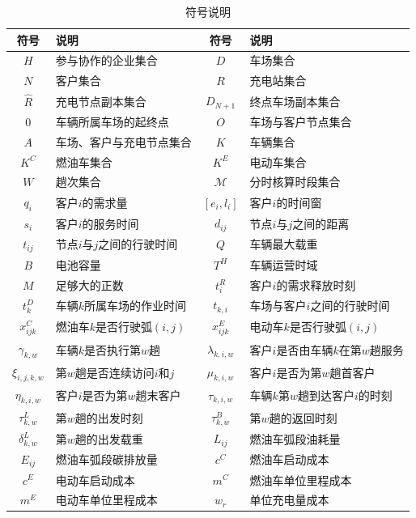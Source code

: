 \begin{table}[H]
\centering
\caption{符号说明}
\label{tab:symbols}
\fontsize{8.3pt}{9.3pt}\selectfont
\renewcommand{\arraystretch}{0.88}
\setlength{\tabcolsep}{1.5pt}
\begin{tabular*}{\linewidth}{@{\extracolsep{\fill}}cJ|cJ@{}}
\toprule
符号 & 说明 & 符号 & 说明\\
\midrule
$H$ & 参与协作的企业集合 & $D$ & 车场集合\\
$N$ & 客户集合 & $R$ & 充电站集合\\
$\widehat R$ & 充电节点副本集合 & $D_{N+1}$ & 终点车场副本集合\\
$0$ & 车辆所属车场的起终点 & $O$ & 车场与客户节点集合\\
$A$ & 车场、客户与充电节点集合 & $K$ & 车辆集合\\
$K^C$ & 燃油车集合 & $K^E$ & 电动车集合\\
$W$ & 趟次集合 & $\mathcal M$ & 分时核算时段集合\\
$q_i$ & 客户$i$的需求量 & $[e_i,l_i]$ & 客户$i$的时间窗\\
$s_i$ & 客户$i$的服务时间 & $d_{ij}$ & 节点$i$与$j$之间的距离\\
$t_{ij}$ & 节点$i$与$j$之间的行驶时间 & $Q$ & 车辆最大载重\\
$B$ & 电池容量 & $T^H$ & 车辆运营时域\\
$M$ & 足够大的正数 & $t_i^R$ & 客户$i$的需求释放时刻\\
$t_k^D$ & 车辆$k$所属车场的作业时间 & $t_{k,i}$ & 车场与客户$i$之间的行驶时间\\
$x_{ijk}^C$ & 燃油车$k$是否行驶弧$(i,j)$ & $x_{ijk}^E$ & 电动车$k$是否行驶弧$(i,j)$\\
$\gamma_{k,w}$ & 车辆$k$是否执行第$w$趟 & $\lambda_{k,i,w}$ & 客户$i$是否由车辆$k$在第$w$趟服务\\
$\xi_{i,j,k,w}$ & 第$w$趟是否连续访问$i$和$j$ & $\mu_{k,i,w}$ & 客户$i$是否为第$w$趟首客户\\
$\eta_{k,i,w}$ & 客户$i$是否为第$w$趟末客户 & $\tau_{k,i,w}$ & 车辆$k$第$w$趟到达客户$i$的时刻\\
$\tau_{k,w}^{L}$ & 第$w$趟的出发时刻 & $\tau_{k,w}^{B}$ & 第$w$趟的返回时刻\\
$\delta_{k,w}^{L}$ & 第$w$趟的出发载重 & $L_{ij}$ & 燃油车弧段油耗量\\
$E_{ij}$ & 燃油车弧段碳排放量 & $c^C$ & 燃油车启动成本\\
$c^E$ & 电动车启动成本 & $m^C$ & 燃油车单位里程成本\\
$m^E$ & 电动车单位里程成本 & $w_r$ & 单位充电量成本\\

\end{tabular*}
\end{table}
